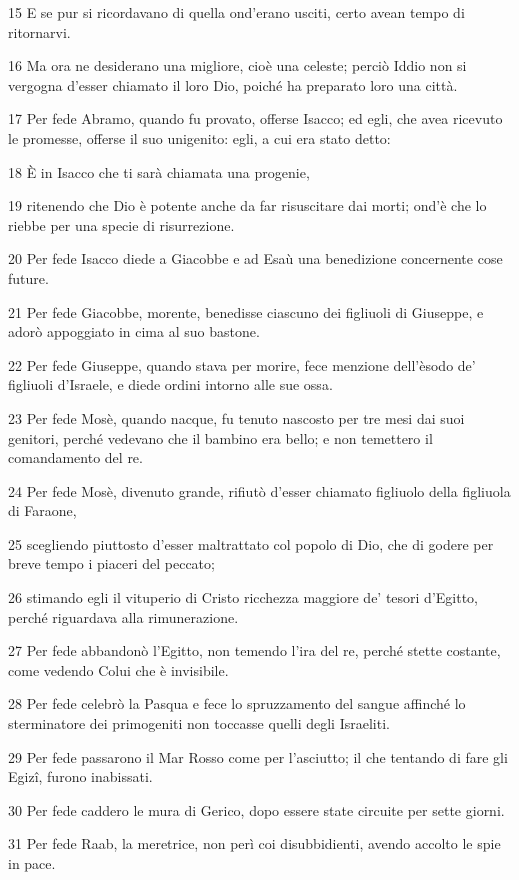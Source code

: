 \par 15 E se pur si ricordavano di quella ond'erano usciti, certo avean tempo di ritornarvi.
\par 16 Ma ora ne desiderano una migliore, cioè una celeste; perciò Iddio non si vergogna d'esser chiamato il loro Dio, poiché ha preparato loro una città.
\par 17 Per fede Abramo, quando fu provato, offerse Isacco; ed egli, che avea ricevuto le promesse, offerse il suo unigenito: egli, a cui era stato detto:
\par 18 È in Isacco che ti sarà chiamata una progenie,
\par 19 ritenendo che Dio è potente anche da far risuscitare dai morti; ond'è che lo riebbe per una specie di risurrezione.
\par 20 Per fede Isacco diede a Giacobbe e ad Esaù una benedizione concernente cose future.
\par 21 Per fede Giacobbe, morente, benedisse ciascuno dei figliuoli di Giuseppe, e adorò appoggiato in cima al suo bastone.
\par 22 Per fede Giuseppe, quando stava per morire, fece menzione dell'èsodo de' figliuoli d'Israele, e diede ordini intorno alle sue ossa.
\par 23 Per fede Mosè, quando nacque, fu tenuto nascosto per tre mesi dai suoi genitori, perché vedevano che il bambino era bello; e non temettero il comandamento del re.
\par 24 Per fede Mosè, divenuto grande, rifiutò d'esser chiamato figliuolo della figliuola di Faraone,
\par 25 scegliendo piuttosto d'esser maltrattato col popolo di Dio, che di godere per breve tempo i piaceri del peccato;
\par 26 stimando egli il vituperio di Cristo ricchezza maggiore de' tesori d'Egitto, perché riguardava alla rimunerazione.
\par 27 Per fede abbandonò l'Egitto, non temendo l'ira del re, perché stette costante, come vedendo Colui che è invisibile.
\par 28 Per fede celebrò la Pasqua e fece lo spruzzamento del sangue affinché lo sterminatore dei primogeniti non toccasse quelli degli Israeliti.
\par 29 Per fede passarono il Mar Rosso come per l'asciutto; il che tentando di fare gli Egizî, furono inabissati.
\par 30 Per fede caddero le mura di Gerico, dopo essere state circuite per sette giorni.
\par 31 Per fede Raab, la meretrice, non perì coi disubbidienti, avendo accolto le spie in pace.
